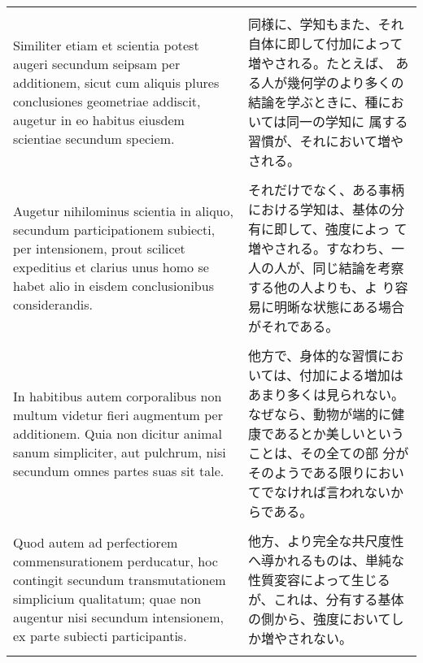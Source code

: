\documentclass[10pt]{jsarticle} %
\begin{document}
\begin{longtable}{p{21em}p{21em}}
\\\\

Similiter etiam et scientia potest augeri secundum
seipsam per additionem, sicut cum aliquis plures conclusiones
geometriae addiscit, augetur in eo habitus eiusdem scientiae secundum
speciem. 


&

同様に、学知もまた、それ自体に即して付加によって増やされる。たとえば、
ある人が幾何学のより多くの結論を学ぶときに、種においては同一の学知に
属する習慣が、それにおいて増やされる。

\\\\

Augetur nihilominus scientia in aliquo, secundum
participationem subiecti, per intensionem, prout scilicet expeditius
et clarius unus homo se habet alio in eisdem conclusionibus
considerandis. 


&

それだけでなく、ある事柄における学知は、基体の分有に即して、強度によっ
て増やされる。すなわち、一人の人が、同じ結論を考察する他の人よりも、よ
り容易に明晰な状態にある場合がそれである。


\\\\


In habitibus autem corporalibus non multum videtur
fieri augmentum per additionem. Quia non dicitur animal sanum
simpliciter, aut pulchrum, nisi secundum omnes partes suas sit
tale. 


&

他方で、身体的な習慣においては、付加による増加はあまり多くは見られない。
 なぜなら、動物が端的に健康であるとか美しいということは、その全ての部
 分がそのようである限りにおいてでなければ言われないからである。

\\\\


Quod autem ad perfectiorem commensurationem perducatur, hoc
contingit secundum transmutationem simplicium qualitatum; quae non
augentur nisi secundum intensionem, ex parte subiecti
participantis. 


&

他方、より完全な共尺度性へ導かれるものは、単純な性質変容によって生じる
 が、これは、分有する基体の側から、強度においてしか増やされない。


\\\\


\end{longtable}
\end{document}
